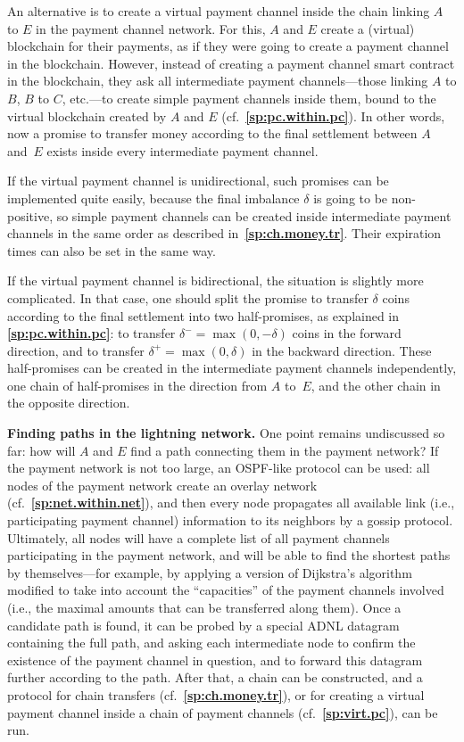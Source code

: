 \documentclass[12pt,oneside]{article}
\def\makepoint#1{\medbreak\noindent{\bf #1.\ }}
\def\nxsubpoint{\refstepcounter{subsubsection}%
  \smallbreak\makepoint{\thesubsubsection}}
\def\refpoint#1{{\rm\textbf{\ref{#1}}}}
\let\ptref=\refpoint
\def\embt(#1.){\textbf{#1.}}
\begin{document}
An alternative is to create a virtual payment channel inside the chain
linking $A$ to $E$ in the payment channel network. For this, $A$ and
$E$ create a (virtual) blockchain for their payments, as if they were
going to create a payment channel in the blockchain. However, instead
of creating a payment channel smart contract in the blockchain, they
ask all intermediate payment channels---those linking $A$ to $B$, $B$
to $C$, etc.---to create simple payment channels inside them, bound
to the virtual blockchain created by $A$ and $E$
(cf.~\ptref{sp:pc.within.pc}). In other words, now a promise to
transfer money according to the final settlement between $A$ and~$E$
exists inside every intermediate payment channel.

If the virtual payment channel is unidirectional, such promises can be
implemented quite easily, because the final imbalance $\delta$ is
going to be non-positive, so simple payment channels can be created
inside intermediate payment channels in the same order as described
in~\ptref{sp:ch.money.tr}. Their expiration times can also be set in
the same way.

If the virtual payment channel is bidirectional, the situation is
slightly more complicated. In that case, one should split the promise
to transfer $\delta$ coins according to the final settlement into two
half-promises, as explained in \ptref{sp:pc.within.pc}: to transfer
$\delta^-=\max(0,-\delta)$ coins in the forward direction, and to
transfer $\delta^+=\max(0,\delta)$ in the backward direction. These
half-promises can be created in the intermediate payment channels
independently, one chain of half-promises in the direction from $A$
to~$E$, and the other chain in the opposite direction.

\nxsubpoint\label{sp:lnet.find.path} \embt(Finding paths in the
lightning network.)  One point remains undiscussed so far: how will
$A$ and $E$ find a path connecting them in the payment network?  If
the payment network is not too large, an OSPF-like protocol can be
used: all nodes of the payment network create an overlay network
(cf.~\ptref{sp:net.within.net}), and then every node propagates all
available link (i.e., participating payment channel) information to
its neighbors by a gossip protocol. Ultimately, all nodes will have a
complete list of all payment channels participating in the payment
network, and will be able to find the shortest paths by
themselves---for example, by applying a version of Dijkstra's
algorithm modified to take into account the ``capacities'' of the
payment channels involved (i.e., the maximal amounts that can be
transferred along them). Once a candidate path is found, it can be
probed by a special ADNL datagram containing the full path, and asking
each intermediate node to confirm the existence of the payment channel
in question, and to forward this datagram further according to the
path. After that, a chain can be constructed, and a protocol for chain
transfers (cf.~\ptref{sp:ch.money.tr}), or for creating a virtual
payment channel inside a chain of payment channels
(cf.~\ptref{sp:virt.pc}), can be run.
\end{document}
